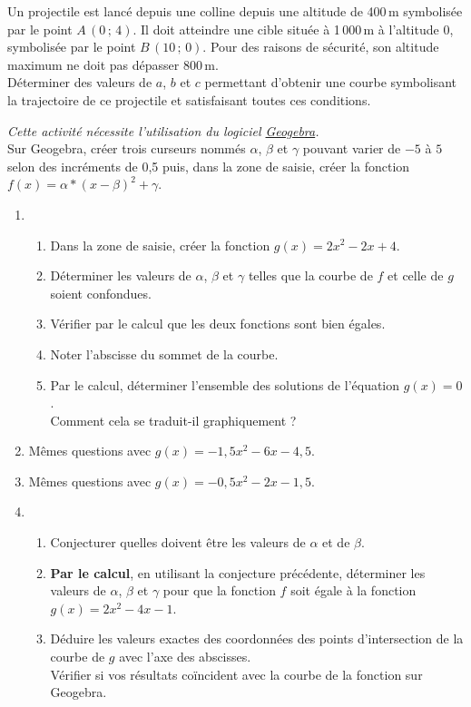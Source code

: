 \begin{act}
\begin{enumerate}
	     Un projectile est lanc\'e depuis une colline depuis une altitude de 400\,m symbolis\'ee par le point $A\,(0\,;\,4)$. Il doit atteindre une cible situ\'ee \`a 1\,000\,m \`a l'altitude 0, symbolis\'ee par le point $B\,(10\,;\,0)$. Pour des raisons de s\'ecurit\'e, son altitude maximum ne doit pas d\'epasser 800\,m.\\
	     D\'eterminer des valeurs de $a$, $b$ et $c$ permettant d'obtenir une courbe symbolisant la trajectoire de ce projectile et satisfaisant toutes ces conditions.
\end{enumerate}
\end{act}

\begin{act}
\emph{Cette activit\'e n\'ecessite l'utilisation du logiciel \href{http://www.geogebra.org/cms/}{Geogebra}.}\\
Sur Geogebra, cr\'eer trois curseurs nomm\'es $\alpha$, $\beta$ et $\gamma$ pouvant varier de $-5$ \`a $5$ selon des incr\'ements de 0,5  puis, dans la zone de saisie, cr\'eer la fonction $f(x)=\alpha*(x-\beta)^2+\gamma$.
\begin{enumerate}
 \item \begin{enumerate}
        \item Dans la zone de saisie, cr\'eer la fonction $g(x)=2x^2-2x+4$.
	\item D\'eterminer les valeurs de $\alpha$, $\beta$ et $\gamma$ telles que la courbe de $f$ et celle de $g$ soient confondues.
	\item V\'erifier par le calcul que les deux fonctions sont bien \'egales.
	\item Noter l'abscisse du sommet de la courbe.
	\item Par le calcul, d\'eterminer l'ensemble des solutions de l'\'equation $g(x)=0$.\\ Comment cela se traduit-il graphiquement ?
       \end{enumerate}
 \item M\^emes questions avec $g(x)=-1,5x^2-6x-4,5$.
 \item M\^emes questions avec $g(x)=-0,5x^2-2x-1,5$.
 \item \begin{enumerate}
        \item Conjecturer quelles doivent \^etre les valeurs de $\alpha$ et de $\beta$.
	\item \textbf{Par le calcul}, en utilisant la conjecture pr\'ec\'edente, d\'eterminer les valeurs de $\alpha$, $\beta$ et $\gamma$ pour que la fonction $f$ soit \'egale \`a la fonction $g(x)=2x^2-4x-1$.
	\item D\'eduire les valeurs exactes des coordonn\'ees des points d'intersection de la courbe de $g$ avec l'axe des abscisses. \\ V\'erifier si vos r\'esultats co\"incident avec la courbe de la fonction sur Geogebra.
       \end{enumerate}
\end{enumerate}
\end{act}

